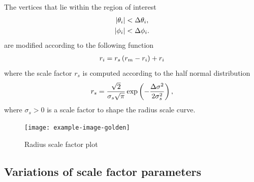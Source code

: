 The vertices that lie within the region of interest
\begin{align*}
    \left| \theta_i \right| &< \Delta \theta_i,  \\
    \left| \phi_i \right| &< \Delta \phi_i .
\end{align*}
are modified according to the following function
\begin{align}
    r_i = r_s \left( r_m - r_i \right) + r_i
\end{align}
where the scale factor \( r_s\) is computed according to the half normal distribution
\begin{align}
    r_s = \frac{\sqrt{2}}{\sigma_s \sqrt{\pi}} \exp \left(  - \frac{\Delta \sigma^2}{2 \sigma_s^2}  \right) ,
\end{align}
where \( \sigma_s > 0 \) is a scale factor to shape the radius scale curve.
\begin{figure}
    \centering
    \texttt{[image: example-image-golden]}
    \caption{Radius scale factor plot~\label{fig:radius_scale_factor}}
\end{figure}

\subsection{Variations of scale factor parameters}



